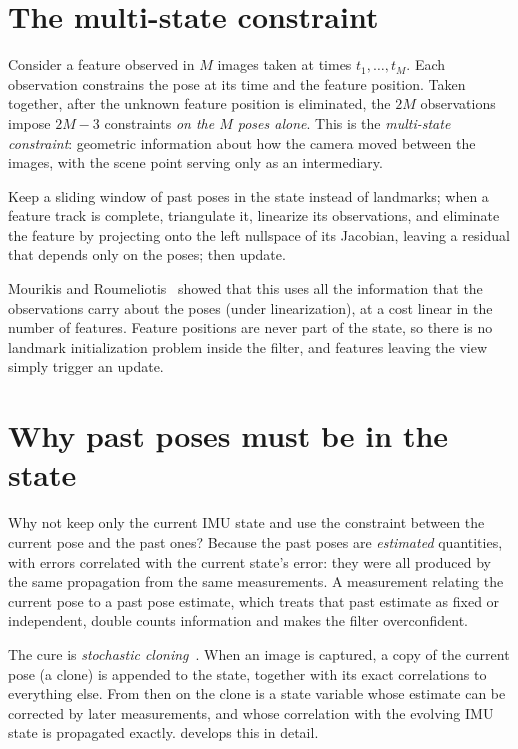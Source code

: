 \section{The multi-state constraint}

Consider a feature observed in $M$ images taken at times $t_1, \dots, t_M$. Each observation constrains the pose at its
time and the feature position. Taken together, after the unknown feature position is eliminated, the $2M$ observations
impose $2M - 3$ constraints \emph{on the $M$ poses alone}. This is the \emph{multi-state constraint}: geometric information
about how the camera moved between the images, with the scene point serving only as an intermediary.

\begin{keyidea}
Keep a sliding window of past poses in the state instead of landmarks; when a feature track is complete,
triangulate it, linearize its observations, and eliminate the feature by projecting onto the left nullspace of its
Jacobian, leaving a residual that depends only on the poses; then update.
\end{keyidea}

Mourikis and Roumeliotis~\cite{mourikis2007msckf} showed that this uses all the information that the observations carry about
the poses (under linearization), at a cost linear in the number of features. Feature positions are never part of the
state, so there is no landmark initialization problem inside the filter, and features leaving the view simply trigger an
update.

\section{Why past poses must be in the state}

Why not keep only the current IMU state and use the constraint between the current pose and the past ones? Because the
past poses are \emph{estimated} quantities, with errors correlated with the current state's error: they were all produced by
the same propagation from the same measurements. A measurement relating the current pose to a past pose estimate, which
treats that past estimate as fixed or independent, double counts information and makes the filter overconfident.

The cure is \emph{stochastic cloning}~\cite{roumeliotis2002cloning}. When an image is captured, a copy of the current pose (a
clone) is appended to the state, together with its exact correlations to everything else. From then on the clone is a
state variable whose estimate can be corrected by later measurements, and whose correlation with the evolving IMU state is
propagated exactly.  develops this in detail.

